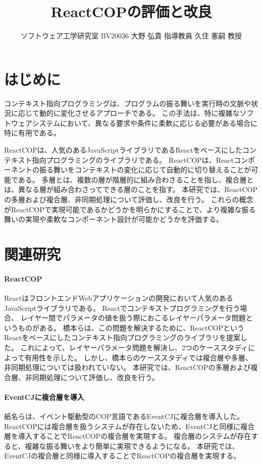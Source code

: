 \documentclass[twocolumn]{jarticle}
\title{
  \LARGE\bf
  ReactCOPの評価と改良 \\[1ex]}
\author{ソフトウェア工学研究室 \quad
        BV20036 大野 弘貴 \quad
        指導教員 久住 憲嗣 教授}
\date{}
\begin{document}
\maketitle
\thispagestyle{empty}

\section{はじめに}

コンテキスト指向プログラミングは、プログラムの振る舞いを実行時の文脈や状況に応じて動的に変化させるアプローチである。
この手法は、特に複雑なソフトウェアシステムにおいて、異なる要求や条件に柔軟に応じる必要がある場合に特に有用である。

ReactCOPは、人気のあるJavaScriptライブラリであるReactをベースにしたコンテキスト指向プログラミングのライブラリである。
ReactCOPは、Reactコンポーネントの振る舞いをコンテキストの変化に応じて自動的に切り替えることが可能である。
多層とは、複数の層が階層的に組み合わさることを指し、複合層とは、異なる層が組み合わさってできる層のことを指す。
本研究では、ReactCOPの多層および複合層、非同期処理について評価し、改良を行う。
これらの概念がReactCOPで実現可能であるかどうかを明らかにすることで、より複雑な振る舞いの実現や柔軟なコンポーネント設計が可能かどうかを評価する。

\section{関連研究}
\paragraph{ReactCOP}
ReactはフロントエンドWebアプリケーションの開発において人気のあるJavaScriptライブラリである。
Reactでコンテキストプログラミングを行う場合、 レイヤー間でパラメータの値を扱う際におこるレイヤーパラメータ問題というものがある。
橋本らは、この問題を解決するために、ReactCOPというReactをベースにしたコンテキスト指向プログラミングのライブラリを提案した。
これによって、レイヤーパラメータ問題を解決し、2つのケーススタディによって有用性を示した。
しかし、橋本らのケーススタディでは複合層や多層、非同期処理については扱われていない。
本研究では、ReactCOPの多層および複合層、非同期処理について評価し、改良を行う。

\paragraph{EventCJに複合層を導入}
紙名らは、イベント駆動型のCOP言語であるEventCJに複合層を導入した。
ReactCOPには複合層を扱うシステムが存在しないため、EventCJと同様に複合層を導入することでReactCOPの複合層を実現する。
複合層のシステムが存在すると、複雑な振る舞いをより簡単に実現できるようになる。
本研究では、EventCJの複合層と同様に導入することでReactCOPの複合層を実現する。
\end{document}
